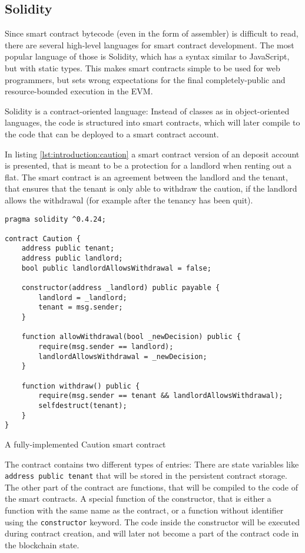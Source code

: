 \subsection{Solidity}
Since smart contract bytecode (even in the form of assembler) is difficult to read, there are several high-level languages for smart contract development. The most popular language of those is Solidity, which has a syntax similar to JavaScript, but with static types. This makes smart contracts simple to be used for web programmers, but sets wrong expectations for the final completely-public and resource-bounded execution in the EVM.

Solidity is a contract-oriented language: Instead of classes as in object-oriented languages, the code is structured into smart contracts, which will later compile to the code that can be deployed to a smart contract account.

In listing \ref{lst:introduction:caution} a smart contract version of an deposit account is presented, that is meant to be a protection for a landlord when renting out a flat. The smart contract is an agreement between the landlord and the tenant, that ensures that the tenant is only able to withdraw the caution, if the landlord allows the withdrawal (for example after the tenancy has been quit).

\begin{listing}
	\begin{verbatim}
pragma solidity ^0.4.24;

contract Caution {
    address public tenant;
    address public landlord;
    bool public landlordAllowsWithdrawal = false;

    constructor(address _landlord) public payable {
        landlord = _landlord;
        tenant = msg.sender;
    }

    function allowWithdrawal(bool _newDecision) public {
        require(msg.sender == landlord);
        landlordAllowsWithdrawal = _newDecision;
    }
    
    function withdraw() public {
        require(msg.sender == tenant && landlordAllowsWithdrawal);
        selfdestruct(tenant);
    }
}
    \end{verbatim}
	\caption{A fully-implemented Caution smart contract}
	\label{lst:introduction:caution}
\end{listing}

The contract contains two different types of entries: There are state variables like \texttt{address public tenant} that will be stored in the persistent contract storage. The other part of the contract are functions, that will be compiled to the code of the smart contracts. A special function of the constructor, that is either a function with the same name as the contract, or a function without identifier using the \texttt{constructor} keyword. The code inside the constructor will be executed during contract creation, and will later not become a part of the contract code in the blockchain state.


